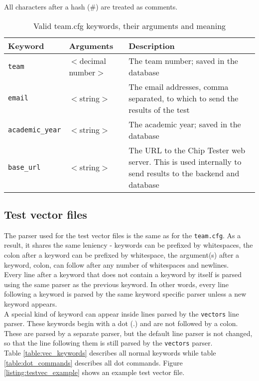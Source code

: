 All characters after a hash (\#) are treated as comments.

\begin{table}[h!]
\centering
\begin{tabular}{ | l | l | p{6cm} | }
 \hline
   Keyword       & Arguments & Description \\
 \hline
   \texttt{team} & $<$decimal number$>$ & The team number; saved in the database \\
 \hline
   \texttt{email} & $<$string$>$ & The email addresses, comma separated, to which to send the results of the test \\
 \hline
   \texttt{academic\_year} & $<$string$>$ & The academic year; saved in the database \\
 \hline
   \texttt{base\_url} & $<$string$>$ & The URL to the Chip Tester web server. This is used internally to send results to the backend and database \\
 \hline
\end{tabular}
\caption{Valid team.cfg keywords, their arguments and meaning}
\label{table:teamcfg_keywords}
\end{table}

\newpage
\subsection{Test vector files}
The parser used for the test vector files is the same as for the \texttt{team.cfg}.
As a result, it shares the same leniency - keywords can be prefixed by whitespaces,
the colon after a keyword can be prefixed by whitespace, the argument(s) after a
keyword, colon, can follow after any number of whitespaces and newlines.
\\

Every line after a keyword that does not contain a keyword by itself is parsed
using the same parser as the previous keyword. In other words, every line following
a keyword is parsed by the same keyword specific parser unless a new keyword appears.
\\

A special kind of keyword can appear inside lines parsed by the \texttt{vectors} line
parser. These keywords begin with a dot (.) and are not followed by a colon. These
are parsed by a separate parser, but the default line parser is not changed, so that
the line following them is still parsed by the \texttt{vectors} parser.
\\

Table \ref{table:vec_keywords} describes all normal keywords while table
\ref{table:dot_commands} describes all dot commands.
Figure \ref{listing:testvec_example} shows an example test vector file.

